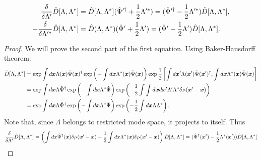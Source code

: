 \begin{lemma}
\label{lmm:formalism:func-wigner:displacement-derivatives}
\begin{equation*}
\begin{split}
	\frac{\delta}{\delta \Lambda^\prime} \hat{D}[\Lambda, \Lambda^*]
	& = \hat{D}[\Lambda, \Lambda^*] (\hat{\Psi}^{\prime\dagger} + \frac{1}{2} \Lambda^{\prime*})
	= (\hat{\Psi}^{\prime\dagger} - \frac{1}{2} \Lambda^{\prime*}) \hat{D}[\Lambda, \Lambda^*], \\
	-\frac{\delta}{\delta \Lambda^{\prime*}} \hat{D}[\Lambda, \Lambda^*]
	& = \hat{D}(\Lambda, \Lambda^*) (\hat{\Psi}^\prime + \frac{1}{2} \Lambda^\prime)
	= (\hat{\Psi}^\prime - \frac{1}{2} \Lambda^\prime) \hat{D}[\Lambda, \Lambda^*].
\end{split}
\end{equation*}
\end{lemma}
\begin{proof}
We will prove the second part of the first equation.
Using Baker-Hausdorff theorem:
\begin{equation*}
\begin{split}
	\hat{D}[\Lambda, \Lambda^*]
	& = \exp \int d\boldsymbol{x} \Lambda(\boldsymbol{x}) \hat{\Psi}(\boldsymbol{x})^\dagger
		\exp \left( -\int d\boldsymbol{x} \Lambda^*(\boldsymbol{x}) \hat{\Psi}(\boldsymbol{x}) \right)
		\exp \frac{1}{2} \left[
			\int d\boldsymbol{x}^\prime \Lambda(\boldsymbol{x}^\prime) \hat{\Psi}(\boldsymbol{x}^\prime)^\dagger,
			\int d\boldsymbol{x} \Lambda^*(\boldsymbol{x}) \hat{\Psi}(\boldsymbol{x})
		\right] \\
	& = \exp \int d\boldsymbol{x} \Lambda \hat{\Psi}^\dagger
		\exp \left( -\int d\boldsymbol{x} \Lambda^* \hat{\Psi} \right)
		\exp \left(
			-\frac{1}{2} \int \int d\boldsymbol{x} d\boldsymbol{x}^\prime
			\Lambda^\prime \Lambda^* \delta_P(\boldsymbol{x}^\prime - \boldsymbol{x})
		\right) \\
	& = \exp \int d\boldsymbol{x} \Lambda \hat{\Psi}^\dagger
		\exp \left( -\int d\boldsymbol{x} \Lambda^* \hat{\Psi} \right)
		\exp \left(
			-\frac{1}{2} \int d\boldsymbol{x} \Lambda \Lambda^*
		\right).
\end{split}
\end{equation*}
Note that, since $\Lambda$ belongs to restricted mode space, it projects to itself.
Thus
\begin{equation*}
\begin{split}
	\frac{\delta}{\delta \Lambda^\prime} \hat{D}[\Lambda, \Lambda^*]
	= \left(
		\int dx \hat{\Psi}^\dagger(\boldsymbol{x}) \delta_P(\boldsymbol{x}^\prime - \boldsymbol{x})
		- \frac{1}{2} \int dx \Lambda^*(\boldsymbol{x}) \delta_P(\boldsymbol{x}^\prime - \boldsymbol{x})
	\right) \hat{D}[\Lambda, \Lambda^*]
	= (\hat{\Psi}^\dagger(\boldsymbol{x}^\prime) - \frac{1}{2} \Lambda^*(\boldsymbol{x}^\prime)) \hat{D}[\Lambda, \Lambda^*]
	\qedhere
\end{split}
\end{equation*}
\end{proof}

